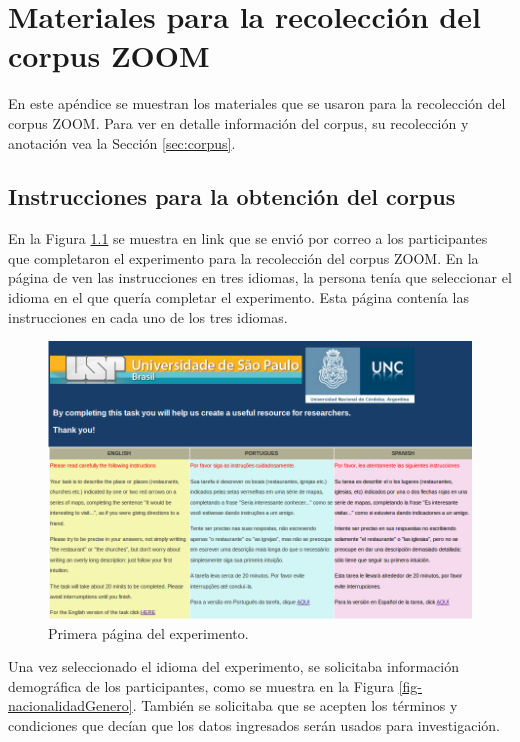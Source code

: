 \appendix

\chapter{Materiales para la recolecci\'on del corpus ZOOM}\label{apendiceA}

En este ap\'endice se muestran los materiales que se usaron para la recolecci\'on del corpus ZOOM. Para ver en detalle informaci\'on del corpus, su recolecci\'on y anotaci\'on vea la Secci\'on \ref{sec:corpus}.

\section{Instrucciones para la obtenci\'on del corpus}
\label{corpus-apendice}

En la Figura \ref{fig-pagPrincipal} se muestra en link que se envi\'o por correo a los participantes que completaron el experimento para la recolecci\'on del corpus ZOOM. En la p\'agina de ven las instrucciones en tres idiomas, la persona ten\'ia que seleccionar el idioma en el que quer\'ia completar el experimento. Esta p\'agina conten\'ia las instrucciones en cada uno de los tres idiomas.

\begin{figure}[h]
\begin{center}
\includegraphics[width=\textwidth]{images/pagPrincipal.png}
\caption{Primera p\'agina del experimento.}
\label{fig-pagPrincipal}
\end{center}
\end{figure}

Una vez seleccionado el idioma del experimento, se solicitaba informaci\'on demogr\'afica de los participantes, como se muestra en la Figura \ref{fig-nacionalidadGenero}. Tambi\'en se solicitaba que se acepten los t\'erminos y condiciones que dec\'ian que los datos ingresados ser\'an usados para investigaci\'on.

